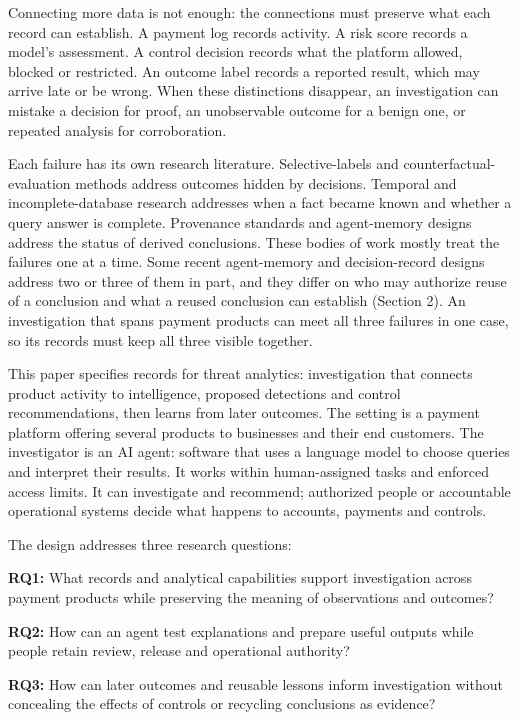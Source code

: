 \documentclass[
  11pt,
]{article}
\begin{document}
Connecting more data is not enough: the connections must preserve what
each record can establish. A payment log records activity. A risk score
records a model's assessment. A control decision records what the
platform allowed, blocked or restricted. An outcome label records a
reported result, which may arrive late or be wrong. When these
distinctions disappear, an investigation can mistake a decision for
proof, an unobservable outcome for a benign one, or repeated analysis
for corroboration.

Each failure has its own research literature. Selective-labels and
counterfactual-evaluation methods address outcomes hidden by decisions.
Temporal and incomplete-database research addresses when a fact became
known and whether a query answer is complete. Provenance standards and
agent-memory designs address the status of derived conclusions. These
bodies of work mostly treat the failures one at a time. Some recent
agent-memory and decision-record designs address two or three of them in
part, and they differ on who may authorize reuse of a conclusion and
what a reused conclusion can establish (Section 2). An investigation
that spans payment products can meet all three failures in one case, so
its records must keep all three visible together.

This paper specifies records for threat analytics: investigation that
connects product activity to intelligence, proposed detections and
control recommendations, then learns from later outcomes. The setting is
a payment platform offering several products to businesses and their end
customers. The investigator is an AI agent: software that uses a
language model to choose queries and interpret their results. It works
within human-assigned tasks and enforced access limits. It can
investigate and recommend; authorized people or accountable operational
systems decide what happens to accounts, payments and controls.

The design addresses three research questions:

\textbf{RQ1:} What records and analytical capabilities support
investigation across payment products while preserving the meaning of
observations and outcomes?

\textbf{RQ2:} How can an agent test explanations and prepare useful
outputs while people retain review, release and operational authority?

\textbf{RQ3:} How can later outcomes and reusable lessons inform
investigation without concealing the effects of controls or recycling
conclusions as evidence?
\end{document}
